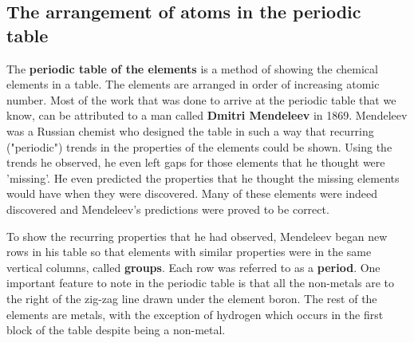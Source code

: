             \subsection{ The arrangement of atoms in the periodic table}
            \nopagebreak
      \label{m38760*id261491}The \textbf{periodic table of the elements} is a method of showing the chemical elements in a table. The elements are arranged in order of increasing atomic number. Most of the work that was done to arrive at the periodic table that we know, can be attributed to a man called \textbf{Dmitri Mendeleev} in 1869. Mendeleev was a Russian chemist who designed the table in such a way that recurring ("periodic") trends in the properties of the elements could be shown. Using the trends he observed, he even left gaps for those elements that he thought were 'missing'. He even predicted the properties that he thought the missing elements would have when they were discovered. Many of these elements were indeed discovered and Mendeleev's predictions were proved to be correct.\par 
      \label{m38760*id261511}To show the recurring properties that he had observed, Mendeleev began new rows in his table so that elements with similar properties were in the same vertical columns, called \textbf{groups}. Each row was referred to as a \textbf{period}. One important feature to note in the periodic table is that all the non-metals are to the right of the zig-zag line drawn under the element boron. The rest of the elements are metals, with the exception of hydrogen which occurs in the first block of the table despite being a non-metal.\par 
    \setcounter{subfigure}{0}
